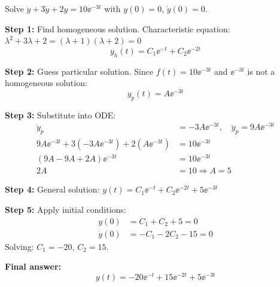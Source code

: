\begin{examplebox}[title=Example: Undetermined Coefficients with Exponential Forcing]
Solve $\ddot{y} + 3\dot{y} + 2y = 10\ee^{-3t}$ with $y(0) = 0$, $\dot{y}(0) = 0$.

\textbf{Step 1:} Find homogeneous solution. Characteristic equation: $\lambda^2 + 3\lambda + 2 = (\lambda+1)(\lambda+2) = 0$
\begin{equation}
y_h(t) = C_1\ee^{-t} + C_2\ee^{-2t}
\end{equation}

\textbf{Step 2:} Guess particular solution. Since $f(t) = 10\ee^{-3t}$ and $\ee^{-3t}$ is not a homogeneous solution:
\begin{equation}
y_p(t) = A\ee^{-3t}
\end{equation}

\textbf{Step 3:} Substitute into ODE:
\begin{align}
\dot{y}_p &= -3A\ee^{-3t}, \quad \ddot{y}_p = 9A\ee^{-3t} \\
9A\ee^{-3t} + 3(-3A\ee^{-3t}) + 2(A\ee^{-3t}) &= 10\ee^{-3t} \\
(9A - 9A + 2A)\ee^{-3t} &= 10\ee^{-3t} \\
2A &= 10 \Rightarrow A = 5
\end{align}

\textbf{Step 4:} General solution: $y(t) = C_1\ee^{-t} + C_2\ee^{-2t} + 5\ee^{-3t}$

\textbf{Step 5:} Apply initial conditions:
\begin{align}
y(0) &= C_1 + C_2 + 5 = 0 \\
\dot{y}(0) &= -C_1 - 2C_2 - 15 = 0
\end{align}
Solving: $C_1 = -20$, $C_2 = 15$.

\textbf{Final answer:}
\begin{equation}
y(t) = -20\ee^{-t} + 15\ee^{-2t} + 5\ee^{-3t}
\end{equation}
\end{examplebox}

